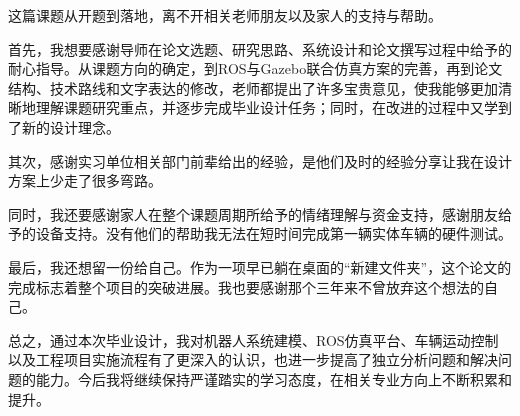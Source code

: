 \begin{acknowledgements}

这篇课题从开题到落地，离不开相关老师朋友以及家人的支持与帮助。

首先，我想要感谢导师在论文选题、研究思路、系统设计和论文撰写过程中给予的耐心指导。从课题方向的确定，到ROS与Gazebo联合仿真方案的完善，再到论文结构、技术路线和文字表达的修改，老师都提出了许多宝贵意见，使我能够更加清晰地理解课题研究重点，并逐步完成毕业设计任务；同时，在改进的过程中又学到了新的设计理念。

其次，感谢实习单位相关部门前辈给出的经验，是他们及时的经验分享让我在设计方案上少走了很多弯路。

同时，我还要感谢家人在整个课题周期所给予的情绪理解与资金支持，感谢朋友给予的设备支持。没有他们的帮助我无法在短时间完成第一辆实体车辆的硬件测试。

最后，我还想留一份给自己。作为一项早已躺在桌面的“新建文件夹”，这个论文的完成标志着整个项目的突破进展。我也要感谢那个三年来不曾放弃这个想法的自己。

总之，通过本次毕业设计，我对机器人系统建模、ROS仿真平台、车辆运动控制以及工程项目实施流程有了更深入的认识，也进一步提高了独立分析问题和解决问题的能力。今后我将继续保持严谨踏实的学习态度，在相关专业方向上不断积累和提升。

\end{acknowledgements}
